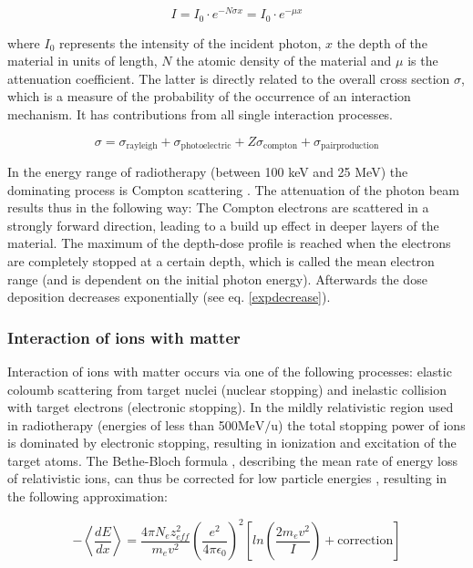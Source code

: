 \begin{equation}
 I = I_{0} \cdot e^{- N \sigma x} = I_{0} \cdot e^{-\mu x}
 \label{expdecrease}
\end{equation} 

where $I_{0}$ represents the intensity of the incident photon, $x$ the depth of the material in units of length, $N$ the atomic density 
of the material and $\mu$ is the attenuation coefficient. The latter is directly related to the overall cross section $\sigma$, which is a 
measure of the probability of the occurrence of an interaction mechanism. It has contributions from all single interaction processes. 

\begin{equation}
{\sigma} = \sigma_{\mathrm{rayleigh}} + \sigma_{\mathrm{photoelectric}} + Z\sigma_{\mathrm{compton}} + \sigma_{\mathrm{pairproduction}} 
\end{equation}

In the energy range of radiotherapy (between 100 keV and 25 MeV) the dominating process is Compton scattering \cite{Alp98}. 
The attenuation of the photon beam results thus in the following way: 
The Compton electrons are scattered in a strongly forward direction, leading to a build up effect in deeper layers of the material. The 
maximum of the depth-dose profile is reached when the electrons are completely stopped at a certain depth, which is called the mean electron 
range (and is dependent on the initial photon energy). Afterwards the dose deposition decreases exponentially (see eq. \ref{expdecrease}). 


\subsubsection{Interaction of ions with matter}

Interaction of ions with matter occurs via one of the following processes: elastic coloumb scattering from target nuclei (nuclear stopping) 
and inelastic collision with target electrons (electronic stopping). In the mildly relativistic region used in radiotherapy 
(energies of less than 500$\mathrm{MeV}/\mathrm{u}$) the total stopping power of ions is dominated by electronic stopping, 
resulting in ionization and excitation of the target atoms. 
The Bethe-Bloch formula \cite{Bet30, Blo33}, describing the mean rate of energy loss of relativistic ions, can thus be corrected 
for low particle energies \cite{Nak10}, resulting in the following approximation:

\begin{equation}
- \left \langle \frac{dE}{dx} \right \rangle = \frac{ 4 \pi N_{e} z_{eff}^{2} }{ m_{e} v^{2} } \left( \frac{e^{2}}{4\pi \epsilon_{0}} \right) ^{2} \left[ln \left( \frac{2m_{e}v^{2}}{I} \right) + \mathrm{correction} \right]
 \label{bethe}
\end{equation}

